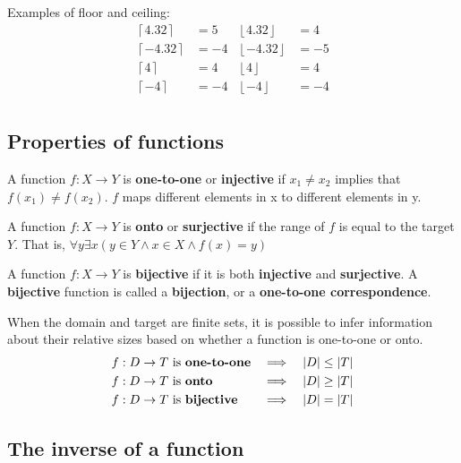 \noindent Examples of floor and ceiling:
\begin{align*}
  \left\lceil 4.32\right\rceil  & = 5  & \left\lfloor 4.32\right\rfloor  & = 4  \\
  \left\lceil -4.32\right\rceil & = -4 & \left\lfloor -4.32\right\rfloor & = -5 \\
  \left\lceil 4\right\rceil     & = 4  & \left\lfloor 4\right\rfloor     & = 4  \\
  \left\lceil -4\right\rceil    & = -4 & \left\lfloor -4\right\rfloor    & = -4 \\
\end{align*}

\subsection{Properties of functions}

A function $f: X \rightarrow Y$ is \textbf{one-to-one} or \textbf{injective} if $x_1 \not = x_2$ implies that $f(x_1) \not = f(x_2)$.
$f$ maps different elements in x to different elements in y.

A function $f: X \rightarrow Y$ is \textbf{onto} or \textbf{surjective} if the range of $f$ is equal to the target $Y$.
That is, $\forall y \exists x (y \in Y \land x \in X \land f(x) = y)$

A function $f: X \rightarrow Y$ is \textbf{bijective} if it is both \textbf{injective} and \textbf{surjective}.
A \textbf{bijective} function is called a \textbf{bijection}, or a \textbf{one-to-one correspondence}.

When the domain and target are finite sets, it is possible to infer information about their relative sizes
based on whether a function is one-to-one or onto.
\begin{align*}
  f: D \rightarrow T & \text{ is \textbf{one-to-one}} & \implies &  & \left\lvert D\right\rvert & \leq \left\lvert T\right\rvert \\
  f: D \rightarrow T & \text{ is \textbf{onto}}       & \implies &  & \left\lvert D\right\rvert & \geq \left\lvert T\right\rvert \\
  f: D \rightarrow T & \text{ is \textbf{bijective}}  & \implies &  & \left\lvert D\right\rvert & = \left\lvert T\right\rvert
\end{align*}

\subsection{The inverse of a function}

